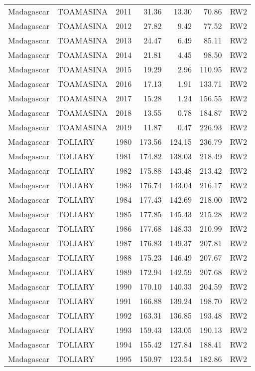 \begin{longtable}{lllrrrl}
  Madagascar & TOAMASINA & 2011 & 31.36 & 13.30 & 70.86 & RW2 \\ 
  Madagascar & TOAMASINA & 2012 & 27.82 & 9.42 & 77.52 & RW2 \\ 
  Madagascar & TOAMASINA & 2013 & 24.47 & 6.49 & 85.11 & RW2 \\ 
  Madagascar & TOAMASINA & 2014 & 21.81 & 4.45 & 98.50 & RW2 \\ 
  Madagascar & TOAMASINA & 2015 & 19.29 & 2.96 & 110.95 & RW2 \\ 
  Madagascar & TOAMASINA & 2016 & 17.13 & 1.91 & 133.71 & RW2 \\ 
  Madagascar & TOAMASINA & 2017 & 15.28 & 1.24 & 156.55 & RW2 \\ 
  Madagascar & TOAMASINA & 2018 & 13.55 & 0.78 & 184.87 & RW2 \\ 
  Madagascar & TOAMASINA & 2019 & 11.87 & 0.47 & 226.93 & RW2 \\ 
  Madagascar & TOLIARY & 1980 & 173.56 & 124.15 & 236.79 & RW2 \\ 
  Madagascar & TOLIARY & 1981 & 174.82 & 138.03 & 218.49 & RW2 \\ 
  Madagascar & TOLIARY & 1982 & 175.88 & 143.48 & 213.42 & RW2 \\ 
  Madagascar & TOLIARY & 1983 & 176.74 & 143.04 & 216.17 & RW2 \\ 
  Madagascar & TOLIARY & 1984 & 177.43 & 142.69 & 218.00 & RW2 \\ 
  Madagascar & TOLIARY & 1985 & 177.85 & 145.43 & 215.28 & RW2 \\ 
  Madagascar & TOLIARY & 1986 & 177.68 & 148.33 & 210.99 & RW2 \\ 
  Madagascar & TOLIARY & 1987 & 176.83 & 149.37 & 207.81 & RW2 \\ 
  Madagascar & TOLIARY & 1988 & 175.23 & 146.49 & 207.67 & RW2 \\ 
  Madagascar & TOLIARY & 1989 & 172.94 & 142.59 & 207.68 & RW2 \\ 
  Madagascar & TOLIARY & 1990 & 170.10 & 140.33 & 204.59 & RW2 \\ 
  Madagascar & TOLIARY & 1991 & 166.88 & 139.24 & 198.70 & RW2 \\ 
  Madagascar & TOLIARY & 1992 & 163.31 & 136.85 & 193.48 & RW2 \\ 
  Madagascar & TOLIARY & 1993 & 159.43 & 133.05 & 190.13 & RW2 \\ 
  Madagascar & TOLIARY & 1994 & 155.42 & 127.84 & 188.41 & RW2 \\ 
  Madagascar & TOLIARY & 1995 & 150.97 & 123.54 & 182.86 & RW2 \\ 

\end{longtable}
